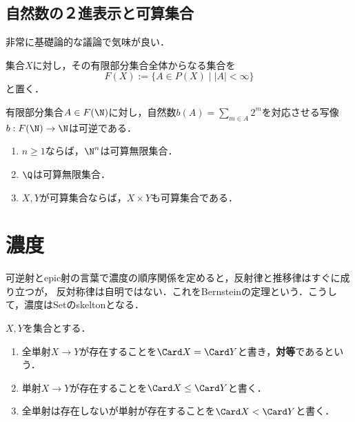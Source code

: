 \documentclass[uplatex,dvipdfmx]{jsreport}
\begin{document}
\subsection{自然数の２進表示と可算集合}

\begin{tcolorbox}[colframe=ForestGreen, colback=ForestGreen!10!white, breakable ,colbacktitle=ForestGreen!40!white, coltitle=black,fonttitle=\bfseries\sffamily
    ,title=自然数の２進表示]
    非常に基礎論的な議論で気味が良い．
\end{tcolorbox}

\begin{notation}
    集合$X$に対し，その有限部分集合全体からなる集合を
    \[ F(X):=\{A\in P(X)\mid|A|<\infty\} \]
    と置く．
\end{notation}

\begin{proposition}
    有限部分集合$A\in F(\N)$に対し，自然数$b(A)=\sum_{m\in A}2^m$を対応させる写像$b:F(\N)\to\N$は可逆である．
\end{proposition}

\begin{corollary}\mbox{}
    \begin{enumerate}
        \item $n\ge 1$ならば，$\N^n$は可算無限集合．
        \item $\Q$は可算無限集合．
        \item $X,Y$が可算集合ならば，$X\times Y$も可算集合である．
    \end{enumerate}
\end{corollary}

\section{濃度}


\begin{tcolorbox}[colframe=ForestGreen, colback=ForestGreen!10!white, breakable ,colbacktitle=ForestGreen!40!white, coltitle=black,fonttitle=\bfseries\sffamily
    ,title=濃度]
    可逆射とepic射の言葉で濃度の順序関係を定めると，反射律と推移律はすぐに成り立つが，
    反対称律は自明ではない．これをBernsteinの定理という．こうして，濃度はSetのskeltonとなる．
\end{tcolorbox}

\begin{definition}[equipotent]
    $X,Y$を集合とする．
    \begin{enumerate}
        \item 全単射$X\to Y$が存在することを$\Card X=\Card Y$と書き，\textbf{対等}であるという．
        \item 単射$X\to Y$が存在することを$\Card X\le \Card Y$と書く．
        \item 全単射は存在しないが単射が存在することを$\Card X<\Card Y$と書く．
    \end{enumerate}
\end{definition}
\end{document}
